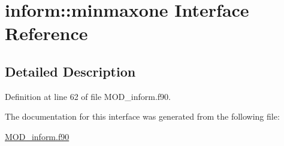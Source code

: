 \hypertarget{interfaceinform_1_1minmaxone}{\section{inform\-:\-:minmaxone Interface Reference}
\label{interfaceinform_1_1minmaxone}
}


\subsection{Detailed Description}


Definition at line 62 of file M\-O\-D\-\_\-inform.\-f90.



The documentation for this interface was generated from the following file\-:\begin{DoxyCompactItemize}
\item 
\hyperlink{MOD__inform_8f90}{M\-O\-D\-\_\-inform.\-f90}\end{DoxyCompactItemize}
